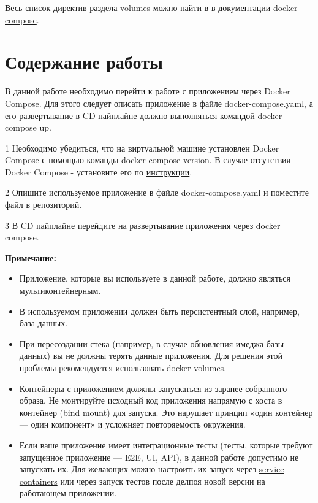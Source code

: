 \documentclass[12pt,a4paper]{article}
\begin{document}
    Весь список директив раздела volumes можно найти в \href{https://docs.docker.com/reference/compose-file/volumes/}{в документации docker compose}.

    \section{Содержание работы}

    В данной работе необходимо перейти к работе с приложением через Docker Compose. Для этого следует описать приложение
    в файле docker-compose.yaml, а его развертывание в CD пайплайне должно выполняться командой docker compose up.

    \begin{task}{1}
        Необходимо убедиться, что на виртуальной машине установлен Docker Compose с помощью команды docker compose version.
        В случае отсутствия Docker Compose - установите его по \href{https://docs.docker.com/compose/install/linux/}{инструкции}.
    \end{task}

    \begin{task}{2}
        Опишите используемое приложение в файле docker-compose.yaml и поместите файл в репозиторий.
    \end{task}

    \begin{task}{3}
        В CD пайплайне перейдите на развертывание приложения через docker compose.
    \end{task}

    \textbf{Примечание:}
    \begin{itemize}
        \item Приложение, которые вы используете в данной работе, должно являться мультиконтейнерным.
        \item В используемом приложении должен быть персистентный слой, например, база данных.
        \item При пересоздании стека (например, в случае обновления имеджа базы данных) вы не должны терять данные приложения. Для решения этой проблемы рекомендуется использовать docker volumes.
        \item Контейнеры с приложением должны запускаться из заранее собранного образа.
        Не монтируйте исходный код приложения напрямую с хоста в контейнер (bind mount) для запуска.
        Это нарушает принцип «один контейнер — один компонент» и усложняет повторяемость окружения.
        \item Если ваше приложение имеет интеграционные тесты (тесты, которые требуют запущенное приложение — E2E, UI, API), в данной работе допустимо не запускать их. Для желающих можно настроить их запуск через \href{https://docs.github.com/en/actions/tutorials/use-containerized-services/use-docker-service-containers}{service containers} или через запуск тестов после делпоя новой версии на работающем приложении.
    \end{itemize}
\end{document}
